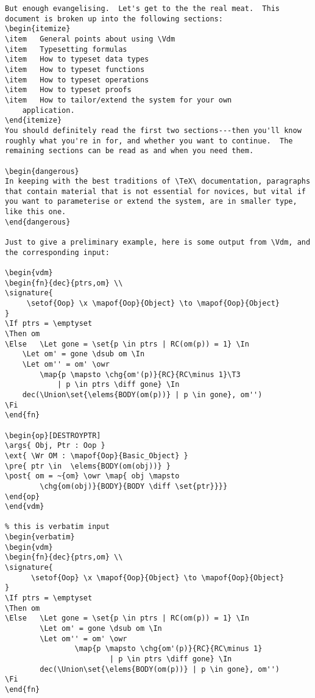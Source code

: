 {\begin{verbatim}
But enough evangelising.  Let's get to the the real meat.  This
document is broken up into the following sections:
\begin{itemize}
\item	General points about using \Vdm
\item	Typesetting formulas
\item	How to typeset data types
\item	How to typeset functions
\item	How to typeset operations
\item	How to typeset proofs
\item	How to tailor/extend the system for your own
	application.
\end{itemize}
You should definitely read the first two sections---then you'll know
roughly what you're in for, and whether you want to continue.  The
remaining sections can be read as and when you need them.

\begin{dangerous}
In keeping with the best traditions of \TeX\ documentation, paragraphs
that contain material that is not essential for novices, but vital if
you want to parameterise or extend the system, are in smaller type,
like this one.
\end{dangerous}

Just to give a preliminary example, here is some output from \Vdm, and
the corresponding input:

\begin{vdm}
\begin{fn}{dec}{ptrs,om} \\
\signature{
	 \setof{Oop} \x \mapof{Oop}{Object} \to \mapof{Oop}{Object} 
}
\If ptrs = \emptyset
\Then om
\Else 	\Let gone = \set{p \in ptrs | RC(om(p)) = 1} \In
	\Let om' = gone \dsub om \In
	\Let om'' = om' \owr
		\map{p \mapsto \chg{om'(p)}{RC}{RC\minus 1}\T3
			| p \in ptrs \diff gone} \In
	dec(\Union\set{\elems{BODY(om(p))} | p \in gone}, om'')
\Fi
\end{fn}

\begin{op}[DESTROYPTR]
\args{ Obj, Ptr : Oop }
\ext{ \Wr OM : \mapof{Oop}{Basic_Object} }
\pre{ ptr \in  \elems{BODY(om(obj))} }
\post{ om = ~{om} \owr \map{ obj \mapsto 
		\chg{om(obj)}{BODY}{BODY \diff \set{ptr}}}}
\end{op}
\end{vdm}

% this is verbatim input
\begin{verbatim}
\begin{vdm}
\begin{fn}{dec}{ptrs,om} \\
\signature{
      \setof{Oop} \x \mapof{Oop}{Object} \to \mapof{Oop}{Object} 
}
\If ptrs = \emptyset
\Then om
\Else   \Let gone = \set{p \in ptrs | RC(om(p)) = 1} \In
        \Let om' = gone \dsub om \In
        \Let om'' = om' \owr
                \map{p \mapsto \chg{om'(p)}{RC}{RC\minus 1}
                        | p \in ptrs \diff gone} \In
        dec(\Union\set{\elems{BODY(om(p))} | p \in gone}, om'')
\Fi
\end{fn}


\end{verbatim}}
